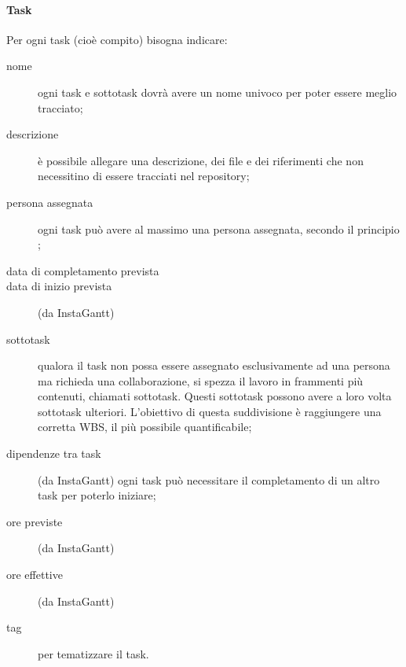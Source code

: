 \paragraph{Task} Per ogni task (cioè compito) bisogna indicare:
\begin{description}
	\item[nome] ogni task e sottotask dovrà avere un nome univoco per poter essere meglio tracciato;
	\item[descrizione] è possibile allegare una descrizione, dei file e dei riferimenti che non necessitino di essere tracciati nel repository;
	\item[persona assegnata] ogni task può avere al massimo una persona assegnata, secondo il principio ; 
	\item[data di completamento prevista]
	\item[data di inizio prevista] (da InstaGantt)
	\item[sottotask] qualora il task non possa essere assegnato esclusivamente ad una persona ma richieda una collaborazione, si spezza il lavoro in frammenti più contenuti, chiamati sottotask. Questi sottotask possono avere a loro volta sottotask ulteriori. L'obiettivo di questa suddivisione è raggiungere una corretta WBS, il più possibile quantificabile;
	\item[dipendenze tra task] (da InstaGantt) ogni task può necessitare il completamento di un altro task per poterlo iniziare;
	\item[ore previste] (da InstaGantt)
	\item[ore effettive] (da InstaGantt)
	\item[tag] per tematizzare il task.
\end{description}
